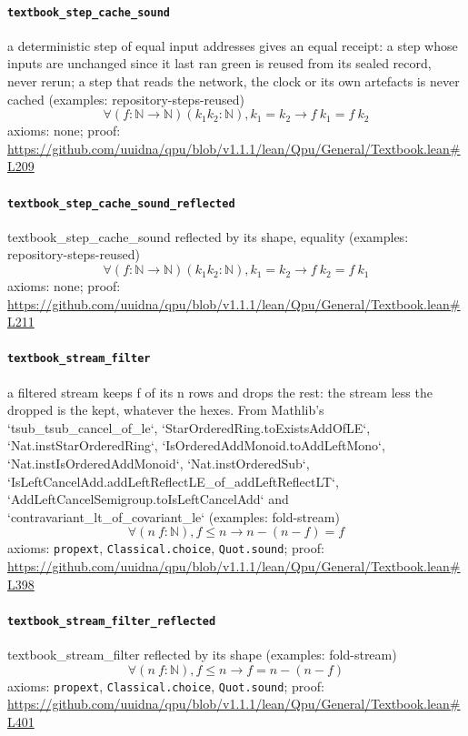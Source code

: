 \documentclass[11pt]{article}
\begin{document}
\paragraph{\texttt{textbook\_step\_cache\_sound}}
a deterministic step of equal input addresses gives an equal receipt: a step whose inputs are unchanged since it last ran green is reused from its sealed record, never rerun; a step that reads the network, the clock or its own artefacts is never cached (examples: repository-steps-reused)
\[ \forall (f : \mathbb{N} \to \mathbb{N}) (k_{1} k_{2} : \mathbb{N}), k_{1} = k_{2} \to f\ k_{1} = f\ k_{2} \]
\noindent axioms: none; proof: \url{https://github.com/uuidna/qpu/blob/v1.1.1/lean/Qpu/General/Textbook.lean\#L209}

\paragraph{\texttt{textbook\_step\_cache\_sound\_reflected}}
textbook\_step\_cache\_sound reflected by its shape, equality (examples: repository-steps-reused)
\[ \forall (f : \mathbb{N} \to \mathbb{N}) (k_{1} k_{2} : \mathbb{N}), k_{1} = k_{2} \to f\ k_{2} = f\ k_{1} \]
\noindent axioms: none; proof: \url{https://github.com/uuidna/qpu/blob/v1.1.1/lean/Qpu/General/Textbook.lean\#L211}

\paragraph{\texttt{textbook\_stream\_filter}}
a filtered stream keeps f of its n rows and drops the rest: the stream less the dropped is the kept, whatever the hexes. From Mathlib's `tsub\_tsub\_cancel\_of\_le`, `StarOrderedRing.toExistsAddOfLE`, `Nat.instStarOrderedRing`, `IsOrderedAddMonoid.toAddLeftMono`, `Nat.instIsOrderedAddMonoid`, `Nat.instOrderedSub`, `IsLeftCancelAdd.addLeftReflectLE\_of\_addLeftReflectLT`, `AddLeftCancelSemigroup.toIsLeftCancelAdd` and `contravariant\_lt\_of\_covariant\_le` (examples: fold-stream)
\[ \forall (n\ f : \mathbb{N}), f \le n \to n - (n - f) = f \]
\noindent axioms: \texttt{propext}, \texttt{Classical.choice}, \texttt{Quot.sound}; proof: \url{https://github.com/uuidna/qpu/blob/v1.1.1/lean/Qpu/General/Textbook.lean\#L398}

\paragraph{\texttt{textbook\_stream\_filter\_reflected}}
textbook\_stream\_filter reflected by its shape (examples: fold-stream)
\[ \forall (n\ f : \mathbb{N}), f \le n \to f = n - (n - f) \]
\noindent axioms: \texttt{propext}, \texttt{Classical.choice}, \texttt{Quot.sound}; proof: \url{https://github.com/uuidna/qpu/blob/v1.1.1/lean/Qpu/General/Textbook.lean\#L401}
\end{document}
